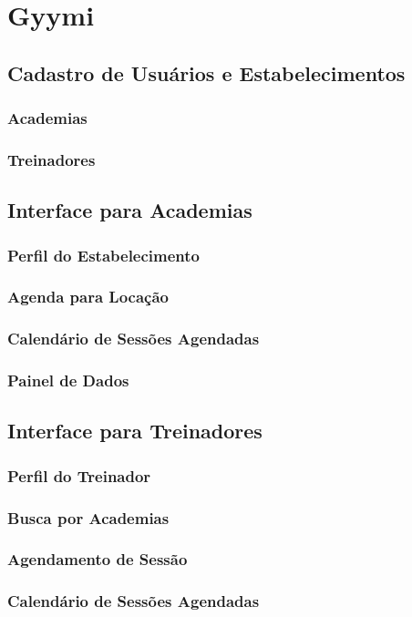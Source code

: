 \chapter{Gyymi}

\section{Cadastro de Usuários e Estabelecimentos}

\subsection{Academias}

\subsection{Treinadores}

\section{Interface para Academias}

\subsection{Perfil do Estabelecimento}

\subsection{Agenda para Locação}

\subsection{Calendário de Sessões Agendadas}

\subsection{Painel de Dados}

\section{Interface para Treinadores}

\subsection{Perfil do Treinador}

\subsection{Busca por Academias}

\subsection{Agendamento de Sessão}

\subsection{Calendário de Sessões Agendadas}
